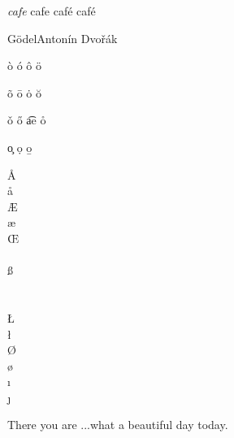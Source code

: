 \documentclass[UTF8]{article}
\begin{document}
\textit{cafe}	cafe caf\'e caf\'e\quad

G\"odel\quad Anton\'in Dvo\v{r}\'ak

\`o \'o \^o \"o

\~o \=o \.o  \u{o}

\v{o} \H{o}  \t{ae} \r{o} 

\c{o}  \d{o} \b{o}

\AA  \\
\aa \\
\AE \\ 
\ae\\
\OE \\
\SS \\
\ss \\ 
\IJ\\ 
\ij\\ 
\L \\
\l \\ 
\O \\
\o \\
\i \\ 
\j 

\begin{flushright}
	There you are ...what a beautiful day today.
\end{flushright}
	
\end{document}
